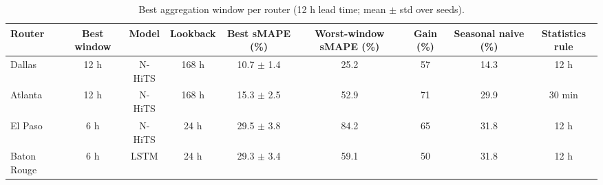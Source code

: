 \begin{table}[t]
\caption{Best aggregation window per router (12 h lead time; mean $\pm$ std over seeds).}
\label{tab:best_window}
\centering
\begin{tabular}{lcccccccc}
\hline
\textbf{Router} & \textbf{Best window} & \textbf{Model} & \textbf{Lookback} & \textbf{Best sMAPE (\%)} & \textbf{Worst-window sMAPE (\%)} & \textbf{Gain (\%)} & \textbf{Seasonal naive (\%)} & \textbf{Statistics rule} \\
\hline
Dallas & 12 h & N-HiTS & 168 h & 10.7 $\pm$ 1.4 & 25.2 & 57 & 14.3 & 12 h \\
Atlanta & 12 h & N-HiTS & 168 h & 15.3 $\pm$ 2.5 & 52.9 & 71 & 29.9 & 30 min \\
El Paso & 6 h & N-HiTS & 24 h & 29.5 $\pm$ 3.8 & 84.2 & 65 & 31.8 & 12 h \\
Baton Rouge & 6 h & LSTM & 24 h & 29.3 $\pm$ 3.4 & 59.1 & 50 & 31.8 & 12 h \\
\hline
\end{tabular}
\end{table}
